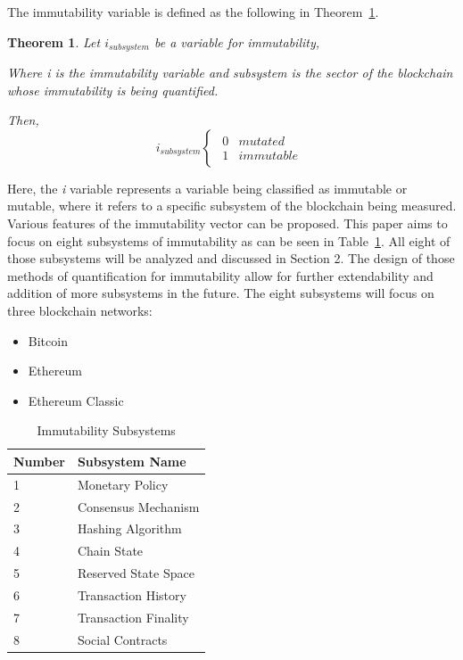 \documentclass{article}
\newtheorem{theorem}{Theorem}
\begin{document}
The immutability variable is defined as the following in Theorem~\ref{th1:theorem}.
\begin{theorem}
Let $i_{subsystem}$ be a variable for immutability,

Where \emph{i} is the immutability variable and
\emph{subsystem }is the sector of the blockchain
whose immutability is being quantified.$ $

Then,
\begin{equation}
    i_{subsystem}\begin{cases}
    \begin{array}
    {cc}
    0 & mutated\\
    1 & immutable
    \end{array}\end{cases} 
    \label{eq1:equation}
\end{equation}
\label{th1:theorem}
\end{theorem}

Here, the \emph{i} variable represents a variable being classified as immutable or mutable, where it refers to a specific subsystem of the blockchain being measured. Various features of the immutability vector can be proposed. This paper aims to focus on eight subsystems of immutability as can be seen in Table~\ref{tab1:table}. All eight of those subsystems will be analyzed and discussed in Section 2. The design of those methods of quantification for immutability allow for further extendability and addition of more subsystems in the future. The eight subsystems will focus on three blockchain networks:
\begin{itemize}
\item Bitcoin
\item Ethereum
\item Ethereum Classic
\end{itemize}

\begin{table}
 \caption{Immutability Subsystems}
  \centering
  \begin{tabular}{ll}
    \toprule
    Number & Subsystem Name      \\
    \midrule
    1 & Monetary Policy \\
    2 & Consensus Mechanism \\
    3 & Hashing Algorithm \\
    4 & Chain State \\
    5 & Reserved State Space \\
    6 & Transaction History \\
    7 & Transaction Finality \\
    8 & Social Contracts \\
    \bottomrule
  \end{tabular}
  \label{tab1:table}
\end{table}
\end{document}
